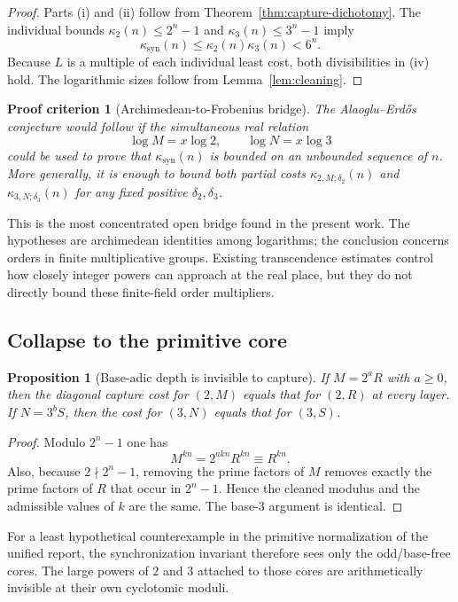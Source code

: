 \documentclass[11pt,oneside]{article}
\newtheorem{proposition}[theorem]{Proposition}
\newtheorem{criterion}[theorem]{Proof criterion}
\theoremstyle{definition}
\theoremstyle{remark}
\newcommand{\AEconj}{Alaoglu--Erd\H{o}s}
\begin{document}
\begin{proof}
Parts (i) and (ii) follow from Theorem~\ref{thm:capture-dichotomy}.  The individual bounds
$\kappa_2(n)\le2^n-1$ and $\kappa_3(n)\le3^n-1$ imply
\[
 \kappa_{\mathrm{syn}}(n)
 \le\kappa_2(n)\kappa_3(n)<6^n.
\]
Because $L$ is a multiple of each individual least cost, both divisibilities in (iv) hold.
The logarithmic sizes follow from Lemma~\ref{lem:cleaning}.
\end{proof}

\begin{criterion}[Archimedean-to-Frobenius bridge]
\label{crit:bridge}
The \AEconj{} conjecture would follow if the simultaneous real relation
\[
 \log M=x\log2,\qquad \log N=x\log3
\]
could be used to prove that $\kappa_{\mathrm{syn}}(n)$ is bounded on an unbounded sequence of
$n$.  More generally, it is enough to bound both partial costs
$\kappa_{2,M;\delta_2}(n)$ and $\kappa_{3,N;\delta_3}(n)$ for any fixed positive
$\delta_2,\delta_3$.
\end{criterion}

This is the most concentrated open bridge found in the present work.  The hypotheses are
archimedean identities among logarithms; the conclusion concerns orders in finite
multiplicative groups.  Existing transcendence estimates control how closely integer powers
can approach at the real place, but they do not directly bound these finite-field order
multipliers.

\subsection{Collapse to the primitive core}

\begin{proposition}[Base-adic depth is invisible to capture]
\label{prop:capture-core}
If $M=2^aR$ with $a\ge0$, then the diagonal capture cost for $(2,M)$ equals that for
$(2,R)$ at every layer.  If $N=3^bS$, then the cost for $(3,N)$ equals that for $(3,S)$.
\end{proposition}

\begin{proof}
Modulo $2^n-1$ one has
\[
 M^{kn}=2^{akn}R^{kn}\equiv R^{kn}.
\]
Also, because $2\nmid2^n-1$, removing the prime factors of $M$ removes exactly the prime
factors of $R$ that occur in $2^n-1$.  Hence the cleaned modulus and the admissible values of
$k$ are the same.  The base-$3$ argument is identical.
\end{proof}

For a least hypothetical counterexample in the primitive normalization of the unified
report, the synchronization invariant therefore sees only the odd/base-free cores.  The
large powers of $2$ and $3$ attached to those cores are arithmetically invisible at their
own cyclotomic moduli.
\end{document}
